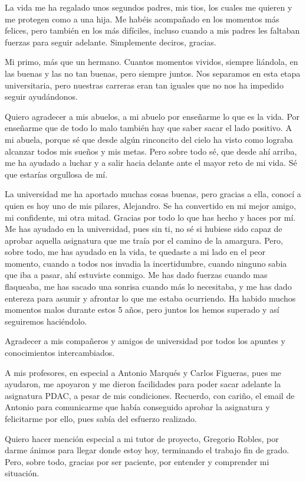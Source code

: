 \documentclass[a4paper, 12pt]{book}
\begin{document}
La vida me ha regalado unos segundos padres, mis tios, los cuales me quieren y me protegen como a una hija. Me habéis acompañado en los momentos más felices, pero también en los más difíciles, incluso cuando a mis padres les faltaban fuerzas para seguir adelante. Simplemente deciros, gracias.

Mi primo, más que un hermano. Cuantos momentos vividos, siempre liándola, en las buenas y las no tan buenas, pero siempre juntos. Nos separamos en esta etapa universitaria, pero nuestras carreras eran tan iguales que no nos ha impedido seguir ayudándonos. 

Quiero agradecer a mis abuelos, a mi abuelo por enseñarme lo que es la vida. Por enseñarme que de todo lo malo también hay que saber sacar el lado positivo. A mi abuela, porque sé que desde algún rinconcito del cielo ha visto como lograba alcanzar todos mis sueños y mis metas. Pero sobre todo sé, que desde ahí arriba, me ha ayudado a luchar y a salir hacia delante ante el mayor reto de mi vida. Sé que estarías orgullosa de mí. 

La universidad me ha aportado muchas cosas buenas, pero gracias a ella, conocí a quien es hoy uno de mis pilares, Alejandro. Se ha convertido en mi mejor amigo, mi confidente, mi otra mitad. Gracias por todo lo que has hecho y haces por mí. Me has ayudado en la universidad, pues sin ti, no sé si hubiese sido capaz de aprobar aquella asignatura que me traía por el camino de la amargura. Pero, sobre todo, me has ayudado en la vida, te quedaste a mi lado en el peor momento, cuando a todos nos invadia la incertidumbre, cuando ninguno sabia que iba a pasar, ahí estuviste conmigo. Me has dado fuerzas cuando mas flaqueaba, me has sacado una sonrisa cuando más lo necesitaba, y me has dado entereza para asumir y afrontar lo que me estaba ocurriendo. Ha habido muchos momentos malos durante estos 5 años, pero juntos los hemos superado y así seguiremos haciéndolo. 

Agradecer a mis compañeros y amigos de universidad por todos los apuntes y conocimientos intercambiados.

A mis profesores, en especial a Antonio Marqués y Carlos Figueras, pues me ayudaron, me apoyaron y me dieron facilidades para poder sacar adelante la asignatura PDAC, a pesar de mis condiciones. Recuerdo, con cariño, el email de Antonio para comunicarme que había conseguido aprobar la asignatura y felicitarme por ello, pues sabía del esfuerzo realizado. 

Quiero hacer mención especial a mi tutor de proyecto, Gregorio Robles, por darme ánimos para llegar donde estoy hoy, terminando el trabajo fin de grado. Pero, sobre todo, gracias por ser paciente, por entender y comprender mi situación. 
\end{document}
